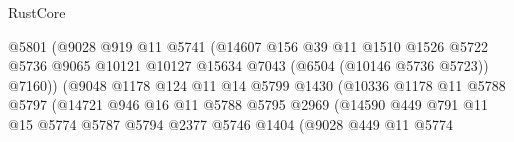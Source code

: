 \begin{lexlean}{RustCore}
\begin{coremodule}
                                      @5801
                                      (@9028
                                        @919
                                        @11
                                        @5741
                                        (@14607
                                          @156
                                          @39
                                          @11
                                          @1510
                                          @1526
                                          @5722
                                          @5736
                                          @9065
                                          @10121
                                          @10127
                                          @15634
                                          @7043
                                          (@6504 (@10146 @5736 @5723))
                                          @7160))
                                      (@9048
                                        @1178
                                        @124
                                        @11
                                        @14
                                        @5799
                                        @1430
                                        (@10336
                                          @1178
                                          @11
                                          @5788
                                          @5797
                                          (@14721
                                            @946
                                            @16
                                            @11
                                            @5788
                                            @5795
                                            @2969
                                            (@14590
                                              @449
                                              @791
                                              @11
                                              @15
                                              @5774
                                              @5787
                                              @5794
                                              @2377
                                              @5746
                                              @1404
                                              (@9028
                                                @449
                                                @11
                                                @5774

\end{coremodule}
\end{lexlean}
